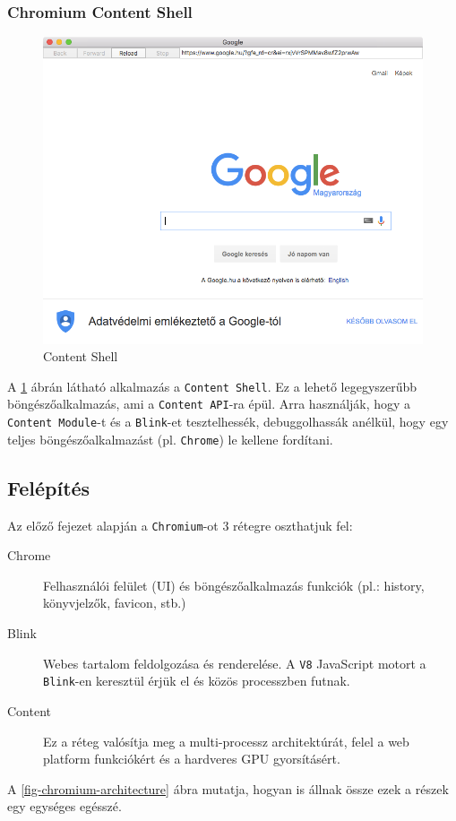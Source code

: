 \documentclass[12pt]{report}
\begin{document}
\subsubsection{Chromium Content Shell}
\begin{figure}[h]
    \centering
    \includegraphics[scale=0.5]{content_shell}
    \caption{
        \label{fig-content-shell}
        Content Shell
    }
\end{figure}

A \ref{fig-content-shell} ábrán látható alkalmazás a \texttt{Content Shell}.
Ez a lehető legegyszerűbb böngészőalkalmazás, ami a \texttt{Content API}-ra épül.
Arra használják, hogy a \\
\texttt{Content Module}-t és a  \texttt{Blink}-et tesztelhessék, debuggolhassák anélkül,
hogy egy teljes böngészőalkalmazást (pl. \texttt{Chrome}) le kellene fordítani.

\subsection{Felépítés}
Az előző fejezet alapján a \texttt{Chromium}-ot 3 rétegre oszthatjuk fel:
\begin{description}
    \item[Chrome]
        Felhasználói felület (UI) és böngészőalkalmazás funkciók
        (pl.: history, könyvjelzők, favicon, stb.)
    \item[Blink]
        Webes tartalom feldolgozása és renderelése. A \texttt{V8} JavaScript motort a \\
        \texttt{Blink}-en keresztül érjük el és közös processzben futnak.
    \item[Content]
        Ez a réteg valósítja meg a multi-processz architektúrát,
        felel a web platform funkciókért és a hardveres GPU gyorsításért.
\end{description}
A \ref{fig-chromium-architecture} ábra mutatja, hogyan is állnak össze ezek a részek egy
egységes egésszé.
\end{document}
